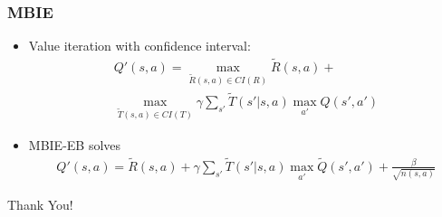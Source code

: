 \documentclass{beamer}
\begin{document}
\begin{frame}
	\frametitle{MBIE}
	\begin{itemize}
		\item Value iteration with confidence interval:
		\begin{multline}
		  Q'(s,a) = \max_{\tilde{R}(s,a) \in CI(R)} \tilde{R}(s,a) + \\ \max_{\tilde{T}(s,a) \in CI(T)} \gamma \sum_{s'} \tilde{T}(s'|s,a) \max_{a'} Q(s',a')
		\end{multline}

		\item MBIE-EB solves
		\begin{multline}
		  Q'(s,a) = \tilde{R}(s,a) +\gamma \sum_{s'} \tilde{T}(s'|s,a) \max_{a'} \tilde{Q}(s',a') + \frac{\beta}{\sqrt{n(s,a)}}
		\end{multline}
	\end{itemize}

	

\end{frame}




\begin{frame}
	\begin{center}
		\Huge Thank You!
	\end{center}
\end{frame}

\end{document}
